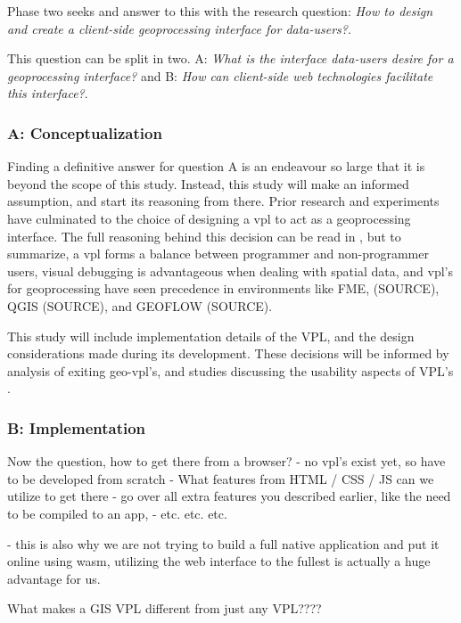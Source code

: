 Phase two seeks and answer to this with the research question: \textit{How to design and create a client-side geoprocessing interface for data-users?}. 

This question can be split in two. A: \textit{What is the interface data-users desire for a geoprocessing interface?} and B:  \textit{How can client-side web technologies facilitate this interface?}. 

\subsubsection*{A: Conceptualization}

Finding a definitive answer for question A is an endeavour so large that it is beyond the scope of this study. Instead, this study will make an informed assumption, and start its reasoning from there. 
Prior research and experiments  have culminated to the choice of designing a \ac{vpl} to act as a geoprocessing interface. The full reasoning behind this decision can be read in , but to summarize, 
a \ac{vpl} forms a balance between programmer and non-programmer users, visual debugging is advantageous when dealing with spatial data, and \ac{vpl}'s for geoprocessing have seen precedence in environments like FME, (SOURCE), QGIS (SOURCE), and GEOFLOW (SOURCE).

This study will include implementation details of the VPL, and the design considerations made during its development. These decisions will be informed by analysis of exiting geo-vpl's, and studies discussing the usability aspects of VPL's \cite{green_usability_1996,peters_geoflow_2019}.


\subsubsection*{B: Implementation}

Now the question, how to get there from a browser?
- no vpl's exist yet, so have to be developed from scratch
- What features from HTML / CSS / JS can we utilize to get there
- go over all extra features you described earlier, like the need to be compiled to an app, 
- etc. etc. etc.

- this is also why we are not trying to build a full native application and put it online using wasm, utilizing the web interface to the fullest is actually a huge advantage for us.

What makes a GIS VPL different from just any VPL???? 

